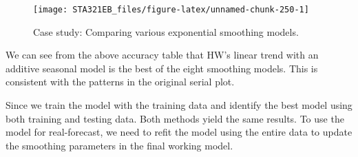 \documentclass[
]{book}
\newenvironment{Shaded}{\begin{snugshade}}{\end{snugshade}}
\newcommand{\AttributeTok}[1]{\textcolor[rgb]{0.13,0.29,0.53}{#1}}
\newcommand{\DecValTok}[1]{\textcolor[rgb]{0.00,0.00,0.81}{#1}}
\newcommand{\DocumentationTok}[1]{\textcolor[rgb]{0.56,0.35,0.01}{\textbf{\textit{#1}}}}
\newcommand{\FloatTok}[1]{\textcolor[rgb]{0.00,0.00,0.81}{#1}}
\newcommand{\FunctionTok}[1]{\textcolor[rgb]{0.13,0.29,0.53}{\textbf{#1}}}
\newcommand{\NormalTok}[1]{#1}
\newcommand{\SpecialCharTok}[1]{\textcolor[rgb]{0.81,0.36,0.00}{\textbf{#1}}}
\newcommand{\StringTok}[1]{\textcolor[rgb]{0.31,0.60,0.02}{#1}}
\begin{document}
\begin{Shaded}
\end{Shaded}

\begin{figure}

{\centering \texttt{[image: STA321EB\_files/figure-latex/unnamed-chunk-250-1]} 

}

\caption{Case study: Comparing various exponential smoothing models.}\label{fig:unnamed-chunk-250}
\end{figure}

We can see from the above accuracy table that HW's linear trend with an additive seasonal model is the best of the eight smoothing models. This is consistent with the patterns in the original serial plot.

Since we train the model with the training data and identify the best model using both training and testing data. Both methods yield the same results. To use the model for real-forecast, we need to refit the model using the entire data to update the smoothing parameters in the final working model.
\end{document}
